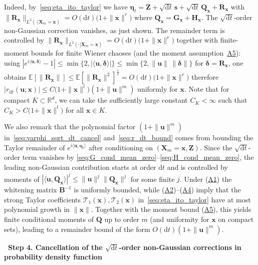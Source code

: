 \documentclass[
 longbibliography,
 twocolumn,
 superscriptaddress,
 amsmath,
 amssymb,
 amsthm,
 amsfonts,
 prl,
 floatfix,
]{revtex4-2}
\begin{document}
\begin{widetext}
Indeed, by~\eqref{seq:eta_ito_taylor} we have $\bm\eta_t=\bm Z+\sqrt{\mathrm dt}\,\bm s+\sqrt{\mathrm dt}\,\bm Q_{\bm x}+\bm R_{\bm x}$ with $\|\bm R_{\bm x}\|_{L^2(\cdot|\bm X_m=\bm x)}=O(\mathrm dt)\big(1+\|\bm x\|^r\big)$ where $\bm Q_{\bm x}=\bm G_{\bm x}+\bm H_{\bm x}$. 
The $\sqrt{\mathrm dt}$-order non-Gaussian correction vanishes, as just shown. 
The remainder term is controlled by $\|\bm R_{\bm x}\|_{L^2(\cdot|\bm X_m=\bm x)}=O(\mathrm dt)\big(1+\|\bm x\|^r\big)$ together with finite-moment bounds for finite Wiener chaoses (and the moment assumption~\hyperlink{assumption:A5}{A5}): using $|e^{i\langle\bm u,\bm \delta\rangle}-1|\leq\min\{2,|\langle\bm u,\bm\delta\rangle|\}\leq\min\{2,\|\bm u\|\,\|\bm\delta\|\}$ for $\bm\delta=\bm R_{\bm x}$, one obtains $\mathbb{E}[\|\bm R_{\bm x}\|]\leq\mathbb{E}\left[\|\bm R_{\bm x}\|^2\right]^{\frac{1}{2}}=O(\mathrm dt)\big(1+\|\bm x\|^r\big)$ 
therefore $\left|r_{\mathrm dt}(\bm u;\bm x)\right|\leq C\big(1+\|\bm x\|^l\big)(1+\|\bm u\|^m)$ uniformly for $\bm x$. Note that for compact $K\subset\mathbb R^d$, we can take the sufficiently large constant $C_K<\infty$ such that $C_K>C\big(1+\|\bm x\|^l\big)$ for all $\bm x\in K$.

We also remark that the polynomial factor $(1+\|\bm u\|^m)$ in~\eqref{seq:varphi_sqrt_dt_cancel} and~\eqref{seq:r_dt_bound} comes from bounding the Taylor remainder of
$e^{i\langle \bm u,\bm\eta_t\rangle}$ after conditioning on $(\bm X_m=\bm x,\bm Z)$.
Since the $\sqrt{\mathrm{d}t}$-order term vanishes by \eqref{seq:G_cond_mean_zero}--\eqref{seq:H_cond_mean_zero},
the leading non-Gaussian contribution starts at order $\mathrm{d}t$ and is controlled by moments of
$|\langle \bm u,\bm Q_{\bm x}\rangle|^j\le \|\bm u\|^j\|\bm Q_{\bm x}\|^j$ for some finite $j$.
Under (\hyperlink{assumption:A1}{A1}) the whitening matrix $\mathbf B^{-1}$ is uniformly bounded, while (\hyperlink{assumption:A2}{A2})--(\hyperlink{assumption:A4}{A4}) imply that the strong Taylor
coefficients $\mathcal T_1(\bm x),\mathcal T_2(\bm x)$ in~\eqref{seq:eta_ito_taylor} have at most polynomial growth in $\|\bm x\|$.
Together with the moment bound (\hyperlink{assumption:A5}{A5}), this yields finite conditional moments of $\bm Q$ up to order $m$
(and uniformity for $\bm x$ on compact sets), leading to a remainder bound of the form
$O(\mathrm dt)(1+\|\bm u\|^m)$.

\bigskip
\noindent\textbf{\textbullet\ Step 4. Cancellation of the $\sqrt{\mathrm{d}t}$-order non-Gaussian corrections in probability density function} 


\end{widetext}
\end{document}
